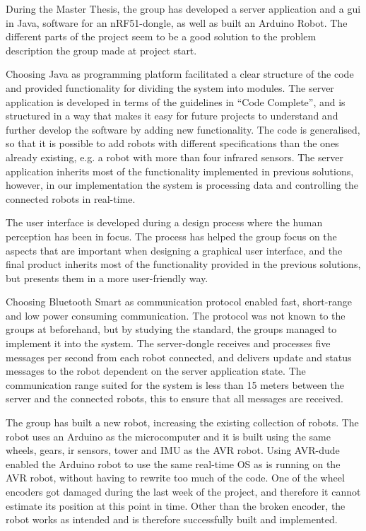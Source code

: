 During the Master Thesis, the group has developed a server application and a \acrlong{gui} in Java, software for an nRF51-dongle, as well as built an Arduino Robot. The different parts of the project seem to be a good solution to the problem description the group made at project start.

Choosing Java as programming platform facilitated a clear structure of the code and provided functionality for dividing the system into modules. The server application is developed in terms of the guidelines in ``Code Complete'', and is structured in a way that makes it easy for future projects to understand and further develop the software by adding new functionality. The code is generalised, so that it is possible to add robots with different specifications than the ones already existing, e.g. a robot with more than four infrared sensors. The server application inherits most of the functionality implemented in previous solutions, however, in our implementation the system is processing data and controlling the connected robots in real-time.

The user interface is developed during a design process where the human perception has been in focus. The process has helped the group focus on the aspects that are important when designing a graphical user interface, and the final product inherits most of the functionality provided in the previous solutions, but presents them in a more user-friendly way.

Choosing Bluetooth Smart as communication protocol enabled fast, short-range and low power consuming communication. The protocol was not known to the groups at beforehand, but by studying the standard, the groups managed to implement it into the system. The server-dongle receives and processes five messages per second from each robot connected, and delivers update and status messages to the robot dependent on the server application state. The communication range suited for the system is less than 15 meters between the server and the connected robots, this to ensure that all messages are received.

The group has built a new robot, increasing the existing collection of robots. The robot uses an Arduino as the microcomputer and it is built using the same wheels, gears, \acrshort{ir} sensors, tower and IMU as the AVR robot. Using AVR-dude enabled the Arduino robot to use the same real-time OS as is running on the AVR robot, without having to rewrite too much of the code. One of the wheel encoders got damaged during the last week of the project, and therefore it cannot estimate its position at this point in time. Other than the broken encoder, the robot works as intended and is therefore successfully built and implemented.

